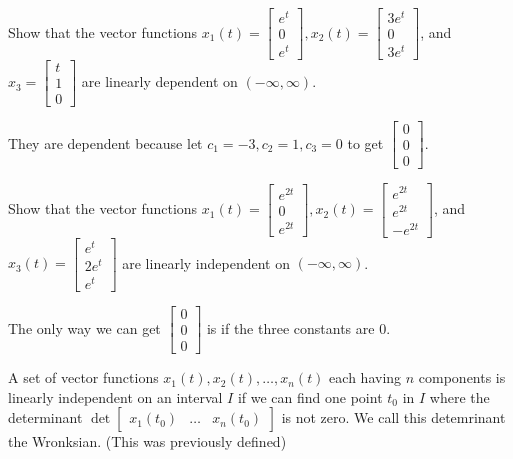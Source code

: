\documentclass[../diffeq.tex]{subfiles}
\begin{document}
\begin{example}
    Show that the vector functions $x_1(t)=\begin{bmatrix}
        e^t\\0\\e^t
    \end{bmatrix}, x_2(t)=\begin{bmatrix}
        3e^t\\0\\3e^t
    \end{bmatrix}$, and $x_3=\begin{bmatrix}
        t\\1\\0
    \end{bmatrix}$ are linearly dependent on $(-\infty,\infty)$.

    They are dependent because let $c_1=-3, c_2=1, c_3=0$ to get $\begin{bmatrix}
        0\\0\\0
    \end{bmatrix}$.
\end{example}

\pagebreak
\begin{example}
    Show that the vector functions $x_1(t)=\begin{bmatrix}
        e^{2t}\\0\\e^{2t}
    \end{bmatrix}, x_2(t)=\begin{bmatrix}
        e^{2t}\\e^{2t}\\-e^{2t}
    \end{bmatrix}$, and $x_3(t)=\begin{bmatrix}
        e^t\\2e^t\\e^t
    \end{bmatrix}$ are linearly independent on $(-\infty,\infty)$.

    The only way we can get $\begin{bmatrix}
        0\\0\\0
    \end{bmatrix}$ is if the three constants are $0$.
\end{example}

A set of vector functions $x_1(t),x_2(t),\dots, x_n(t)$ each having $n$ components is linearly independent on an interval $I$ if we can find one point $t_0$ in $I$ where the determinant 
$\det \begin{bmatrix}
    x_1(t_0) & \dots & x_n(t_0)
\end{bmatrix}$ is not zero. We call this detemrinant the Wronksian. (This was previously defined)
\end{document}
